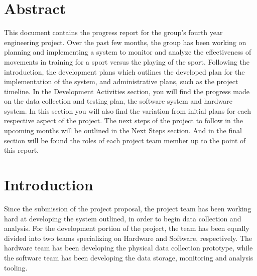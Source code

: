\section{Abstract}
This document contains the progress report for the group's fourth year engineering project. Over the past few months, the group has been working on planning and implementing a system to monitor and analyze the effectiveness of movements in training for a sport versus the playing of the sport. Following the introduction, the development plans which outlines the developed plan for the implementation of the system, and administrative plans, such as the project timeline. In the Development Activities section, you will find the progress made on the data collection and testing plan, the software system and hardware system. In this section you will also find the variation from initial plans for each respective aspect of the project. The next steps of the project to follow in the upcoming months will be outlined in the Next Steps section. And in the final section will be found the roles of each project team member up to the point of this report. 

\section{Introduction}
\setlength{\parindent}{5ex}
\indent
Since the submission of the project proposal, the project team has been working hard at developing the system outlined, in order to begin data collection and analysis. For the development portion of the project, the team has been equally divided into two teams specializing on Hardware and Software, respectively. The hardware team has been developing the physical data collection prototype, while the software team has been developing the data storage, monitoring and analysis tooling. 

